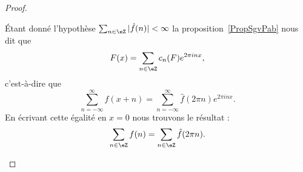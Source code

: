 \begin{proof}
\begin{subproof}
		\spitem[Conclusion]

		Étant donné l'hypothèse \( \sum_{n\in \eZ}| \hat f(n) |<\infty\) la proposition~\ref{PropSgvPab} nous dit que
		\begin{equation}
			F(x)=\sum_{n\in \eZ}c_n(F) e^{2\pi inx},
		\end{equation}
		c'est-à-dire que
		\begin{equation}
			\sum_{n=-\infty}^{\infty}f(x+n)=\sum_{n=-\infty}^{\infty}\hat f(2\pi n) e^{2\pi i nx}.
		\end{equation}
		En écrivant cette égalité en \( x=0\) nous trouvons le résultat :
		\begin{equation}
			\sum_{n\in \eZ}f(n)=\sum_{n\in \eZ}\hat f(2\pi n).
		\end{equation}
	\end{subproof}
\end{proof}

